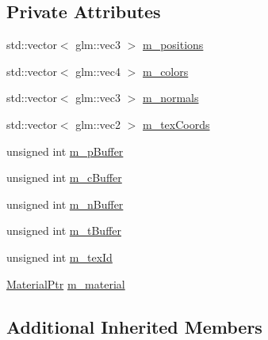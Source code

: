 \subsection*{Private Attributes}
\begin{DoxyCompactItemize}
\item 
std\+::vector$<$ glm\+::vec3 $>$ \hyperlink{classMipMapCubeRenderable_a48b568e8e3cc7bf7b1f5e961b7a5d18b}{m\+\_\+positions}
\item 
std\+::vector$<$ glm\+::vec4 $>$ \hyperlink{classMipMapCubeRenderable_a5221f8391c0ef9ad9a4cc5cd0a079463}{m\+\_\+colors}
\item 
std\+::vector$<$ glm\+::vec3 $>$ \hyperlink{classMipMapCubeRenderable_adefb2e222b21ec9d5983fd578c61daa0}{m\+\_\+normals}
\item 
std\+::vector$<$ glm\+::vec2 $>$ \hyperlink{classMipMapCubeRenderable_a8c1d0d581985087fffa7328474e8167c}{m\+\_\+tex\+Coords}
\item 
unsigned int \hyperlink{classMipMapCubeRenderable_a3baff6d567731575017c9f03f28073cd}{m\+\_\+p\+Buffer}
\item 
unsigned int \hyperlink{classMipMapCubeRenderable_a1e9b398ba5e9adbfc80291d6eb64c8f3}{m\+\_\+c\+Buffer}
\item 
unsigned int \hyperlink{classMipMapCubeRenderable_a62a8adc606b023420b2089961499de09}{m\+\_\+n\+Buffer}
\item 
unsigned int \hyperlink{classMipMapCubeRenderable_a370e12a065599c98250fa40b80078a4d}{m\+\_\+t\+Buffer}
\item 
unsigned int \hyperlink{classMipMapCubeRenderable_af1dd441331717c8edffc73b18edb17e1}{m\+\_\+tex\+Id}
\item 
\hyperlink{Material_8hpp_a1d47cd05ca683e287435cf0b363fbfe1}{Material\+Ptr} \hyperlink{classMipMapCubeRenderable_a0173b7f4dbc0e7b6cc7e6ef48e05d4a1}{m\+\_\+material}
\end{DoxyCompactItemize}
\subsection*{Additional Inherited Members}


